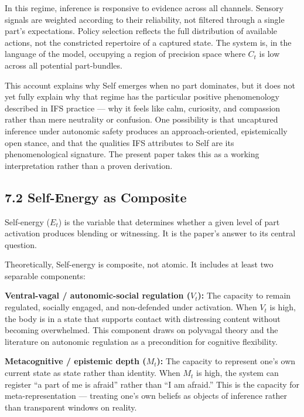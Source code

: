 \documentclass[11pt]{article}
\begin{document}
In this regime, inference is responsive to evidence across all channels.
Sensory signals are weighted according to their reliability, not
filtered through a single part's expectations. Policy selection reflects
the full distribution of available actions, not the constricted
repertoire of a captured state. The system is, in the language of the
model, occupying a region of precision space where \(C_t\) is low across
all potential part-bundles.

This account explains why Self emerges when no part dominates, but it
does not yet fully explain why that regime has the particular positive
phenomenology described in IFS practice --- why it feels like calm,
curiosity, and compassion rather than mere neutrality or confusion. One
possibility is that uncaptured inference under autonomic safety produces
an approach-oriented, epistemically open stance, and that the qualities
IFS attributes to Self are its phenomenological signature. The present
paper takes this as a working interpretation rather than a proven
derivation.

\subsection{7.2 Self-Energy as
Composite}\label{self-energy-as-composite}

Self-energy (\(E_t\)) is the variable that determines whether a given
level of part activation produces blending or witnessing. It is the
paper's answer to its central question.

Theoretically, Self-energy is composite, not atomic. It includes at
least two separable components:

\textbf{Ventral-vagal / autonomic-social regulation (\(V_t\)):} The
capacity to remain regulated, socially engaged, and non-defended under
activation. When \(V_t\) is high, the body is in a state that supports
contact with distressing content without becoming overwhelmed. This
component draws on polyvagal theory and the literature on autonomic
regulation as a precondition for cognitive flexibility.

\textbf{Metacognitive / epistemic depth (\(M_t\)):} The capacity to
represent one's own current state as state rather than identity. When
\(M_t\) is high, the system can register ``a part of me is afraid''
rather than ``I am afraid.'' This is the capacity for
meta-representation --- treating one's own beliefs as objects of
inference rather than transparent windows on reality.
\end{document}
